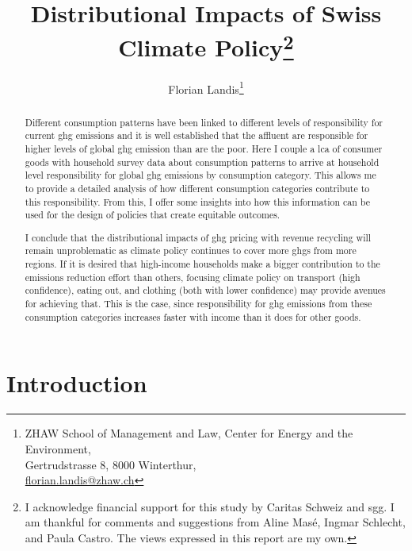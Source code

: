 \documentclass[a4paper,11pt,abstract=true]{scrartcl}
\author{Florian Landis\thanks{%
    ZHAW School of Management and Law, Center for Energy and the Environment, \\
    Gertrudstrasse 8, 8000 Winterthur, \\
    \href{mailto:florian.landis@zhaw.ch}{florian.landis@zhaw.ch}}
}
\title{Distributional Impacts of Swiss Climate Policy\thanks{%
  I acknowledge financial support for this study by Caritas Schweiz and \ac{sgg}.
  I am thankful for comments and suggestions from Aline Masé, Ingmar Schlecht, and Paula Castro.
  The views expressed in this report are my own.
}}
\date{}
\begin{document}
\maketitle
\begin{abstract}
  Different consumption patterns have been linked to different levels of responsibility for current \ac{ghg} emissions and it is well established that the affluent are responsible for higher levels of global \ac{ghg} emission than are the poor.
  Here I couple a \acl{lca} of consumer goods with household survey data about consumption patterns to arrive at household level responsibility for global \ac{ghg} emissions {by consumption category}.
  This allows me to provide a detailed analysis of how different consumption categories contribute to this responsibility.
  From this, I offer some insights into how this information can be used for the design of policies that create equitable outcomes.

  I conclude that the distributional impacts of \ac{ghg} pricing with revenue recycling will remain unproblematic as climate policy continues to cover more \ac{ghg}s from more regions.
  If it is desired that high-income households make a bigger contribution to the emissions reduction effort than others, focusing climate policy on transport (high confidence), eating out, and clothing (both with lower confidence) may provide avenues for achieving that.
  This is the case, since responsibility for \ac{ghg} emissions from these consumption categories increases faster with income than it does for other goods.
\end{abstract}

\section{Introduction}
\label{sec:intro}
\end{document}
